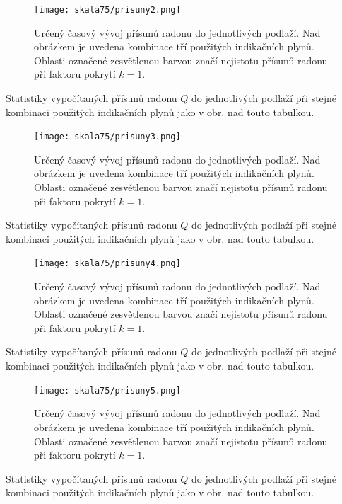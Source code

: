 \begin{figure}[H]
    \centering
    \texttt{[image: skala75/prisuny2.png]}
    \caption{Určený časový vývoj přísunů radonu do jednotlivých podlaží. Nad obrázkem je uvedena kombinace tří použitých indikačních plynů. Oblasti označené zesvětlenou barvou značí nejistotu přísunů radonu při faktoru pokrytí $k=1$.}
    \label{fig:skala75_prisuny2}
\end{figure}
\begin{table}[H]
    \centering
    \caption{Statistiky vypočítaných přísunů radonu $Q$ do jednotlivých podlaží při stejné kombinaci použitých indikačních plynů jako v obr. nad touto tabulkou.}
    \label{tab:skala75_prisuny2}
    
\end{table}

\begin{figure}[H]
    \centering
    \texttt{[image: skala75/prisuny3.png]}
    \caption{Určený časový vývoj přísunů radonu do jednotlivých podlaží. Nad obrázkem je uvedena kombinace tří použitých indikačních plynů. Oblasti označené zesvětlenou barvou značí nejistotu přísunů radonu při faktoru pokrytí $k=1$.}
    \label{fig:skala75_prisuny3}
\end{figure}
\begin{table}[H]
    \centering
    \caption{Statistiky vypočítaných přísunů radonu $Q$ do jednotlivých podlaží při stejné kombinaci použitých indikačních plynů jako v obr. nad touto tabulkou.}
    \label{tab:skala75_prisuny3}
    
\end{table}

\begin{figure}[H]
    \centering
    \texttt{[image: skala75/prisuny4.png]}
    \caption{Určený časový vývoj přísunů radonu do jednotlivých podlaží. Nad obrázkem je uvedena kombinace tří použitých indikačních plynů. Oblasti označené zesvětlenou barvou značí nejistotu přísunů radonu při faktoru pokrytí $k=1$.}
    \label{fig:skala75_prisuny4}
\end{figure}
\begin{table}[H]
    \centering
    \caption{Statistiky vypočítaných přísunů radonu $Q$ do jednotlivých podlaží při stejné kombinaci použitých indikačních plynů jako v obr. nad touto tabulkou.}
    \label{tab:skala75_prisuny4}
    
\end{table}

\begin{figure}[H]
    \centering
    \texttt{[image: skala75/prisuny5.png]}
    \caption{Určený časový vývoj přísunů radonu do jednotlivých podlaží. Nad obrázkem je uvedena kombinace tří použitých indikačních plynů. Oblasti označené zesvětlenou barvou značí nejistotu přísunů radonu při faktoru pokrytí $k=1$.}
    \label{fig:skala75_prisuny5}
\end{figure}
\begin{table}[H]
    \centering
    \caption{Statistiky vypočítaných přísunů radonu $Q$ do jednotlivých podlaží při stejné kombinaci použitých indikačních plynů jako v obr. nad touto tabulkou.}
    \label{tab:skala75_prisuny5}
    
\end{table}

